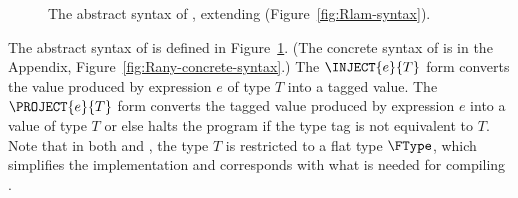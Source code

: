 \documentclass[7x10]{TimesAPriori_MIT}%
\newcommand{\gray}[1]{{\color{gray} #1}}
\begin{document}
\begin{figure}[tp]
\centering
\fbox{
  \begin{minipage}{0.96\textwidth}
    \small
\[
\begin{array}{l}
  \gray{\LintOpAST} \\ \hline
  \gray{\LvarASTRacket{}} \\ \hline
  \gray{\LifASTRacket{}} \\ \hline
  \gray{\LwhileASTRacket{}} \\ \hline
  \gray{\LtupASTRacket{}} \\ \hline
  \gray{\LfunASTRacket} \\ \hline
  \gray{\LlambdaASTRacket} \\ \hline
  \LAnyAST \\
\begin{array}{lcl}
  \LangAnyM{} &::=& \PROGRAMDEFSEXP{\code{'()}}{\LP\Def\ldots\RP}{\Exp}
\end{array}
\end{array}
\]
\end{minipage}
}
\caption{The abstract syntax of \LangAny{}, extending \LangLam{} (Figure~\ref{fig:Rlam-syntax}).}
\label{fig:Rany-syntax}
\end{figure}


The abstract syntax of \LangAny{} is defined in Figure~\ref{fig:Rany-syntax}.
(The concrete syntax of \LangAny{} is in the Appendix,
Figure~\ref{fig:Rany-concrete-syntax}.)  The $\INJECT{e}{T}$ form
converts the value produced by expression $e$ of type $T$ into a
tagged value.  The $\PROJECT{e}{T}$ form converts the tagged value
produced by expression $e$ into a value of type $T$ or else halts the
program if the type tag is not equivalent to $T$.
%
Note that in both  and , the type $T$ is
restricted to a flat type $\FType$, which simplifies the
implementation and corresponds with what is needed for compiling \LangDyn{}.
\end{document}
